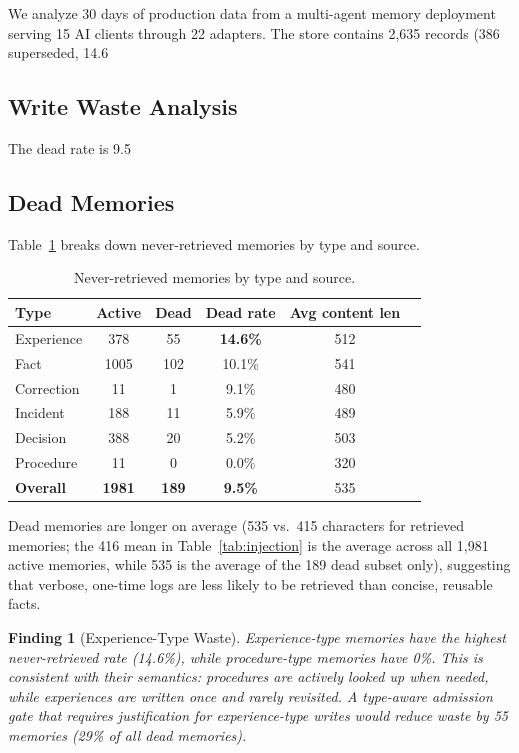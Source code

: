 \documentclass[sigconf,nonacm]{acmart}
\newtheorem{finding}{Finding}
\begin{document}
We analyze 30 days of production data from a multi-agent memory deployment serving 15 AI clients through 22 adapters. The store contains 2,635 records (386 superseded, 14.6%

\subsection{Write Waste Analysis}

The dead rate is 9.5%

\subsection{Dead Memories}

Table~\ref{tab:dead} breaks down never-retrieved memories by type and source.

\begin{table}[h]
\centering
\caption{Never-retrieved memories by type and source.}
\label{tab:dead}
\begin{tabular}{lccccc}
\toprule
Type & Active & Dead & Dead rate & Avg content len \\
\midrule
Experience & 378 & 55 & \textbf{14.6\%} & 512 \\
Fact & 1005 & 102 & 10.1\% & 541 \\
Correction & 11 & 1 & 9.1\% & 480 \\
Incident & 188 & 11 & 5.9\% & 489 \\
Decision & 388 & 20 & 5.2\% & 503 \\
Procedure & 11 & 0 & 0.0\% & 320 \\
\midrule
\textbf{Overall} & \textbf{1981} & \textbf{189} & \textbf{9.5\%} & 535 \\
\bottomrule
\end{tabular}
\end{table}

Dead memories are longer on average (535 vs.\ 415 characters for retrieved memories; the 416 mean in Table~\ref{tab:injection} is the average across all 1,981 active memories, while 535 is the average of the 189 dead subset only), suggesting that verbose, one-time logs are less likely to be retrieved than concise, reusable facts.

\begin{finding}[Experience-Type Waste]
Experience-type memories have the highest never-retrieved rate (14.6\%), while procedure-type memories have 0\%. This is consistent with their semantics: procedures are actively looked up when needed, while experiences are written once and rarely revisited. A type-aware admission gate that requires justification for experience-type writes would reduce waste by 55 memories (29\% of all dead memories).
\end{finding}
\end{document}

